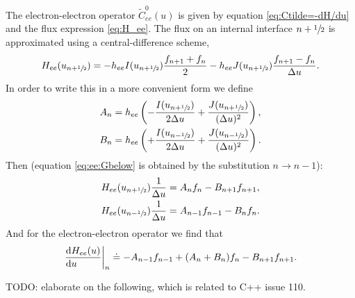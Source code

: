 \documentclass{book}
\newcommand{\frachalf}{\ensuremath{\sfrac{1}{2}}}
\newcommand{\phalf}[1]{\ensuremath{{#1}+\frachalf}}
\newcommand{\mhalf}[1]{\ensuremath{{#1}-\frachalf}}
\begin{document}
The electron-electron operator $\tilde{C}^0_{ee}(u)$ is given by equation
\eqref{eq:Ctilde=-dH/du} and the flux expression \eqref{eq:H_ee}.
The flux on an internal interface $\phalf{n}$ is approximated using a central-difference scheme,
\begin{equation}
	H_{ee}(u_{\phalf{n}})
		=
		- h_{ee}I(u_{\phalf{n}})\frac{f_{n+1}+f_{n}}{2}
		- h_{ee}J(u_{\phalf{n}})\frac{f_{n+1}-f_{n}}{\Delta u}.
\end{equation}
In order to write this in a more convenient form we define \cite[eqn. 39a--b]{Manual_2_2_0}
\begin{align}
	A_n &= h_{ee}\left(-\frac{I(u_{\phalf{n}})}{2\Delta u} + \frac{J(u_{\phalf{n}})}{(\Delta u)^2}\right),
		\label{eq:ee:A} \\
	B_n &= h_{ee}\left(+\frac{I(u_{\mhalf{n}})}{2\Delta u} + \frac{J(u_{\mhalf{n}})}{(\Delta u)^2}\right).
		\label{eq:ee:B}
\end{align}
Then (equation \eqref{eq:ee:Gbelow} is obtained by the substitution $n\rightarrow n-1$):
\begin{align}
	H_{ee}(u_{\phalf{n}})\frac{1}{\Delta u}
		&= A_{n  }f_{n  } - B_{n+1}f_{n+1}, \label{eq:ee:Gabove}
	\\
	H_{ee}(u_{\mhalf{n}})\frac{1}{\Delta u}
		&= A_{n-1}f_{n-1} - B_{n  }f_{n  }. \label{eq:ee:Gbelow}
\end{align}
And for the electron-electron operator we find that
\begin{equation}
	\left.\DERIV{H_{ee}(u)}{u}\right|_n \doteq - A_{n-1}f_{n-1} + (A_n+B_n)f_n - B_{n+1}f_{n+1}.
\end{equation}

TODO: elaborate on the following, which is related to C++ issue 110.
\end{document}
